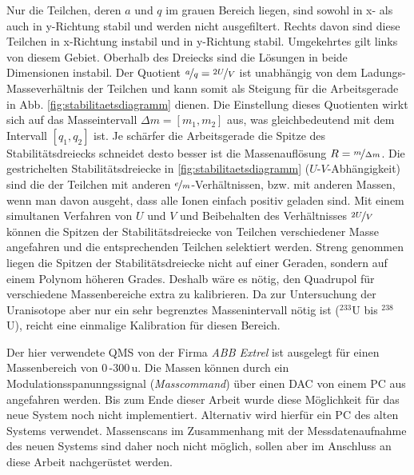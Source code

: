 Nur die Teilchen, deren $a$ und $q$ im grauen
Bereich liegen, sind sowohl in x- als auch in y-Richtung stabil und werden nicht
ausgefiltert. Rechts davon sind diese Teilchen in x-Richtung instabil und in
y-Richtung stabil. Umgekehrtes gilt links von diesem Gebiet. Oberhalb des
Dreiecks sind die Lösungen in beide Dimensionen instabil. Der Quotient
$\nicefrac{a}{q}=\nicefrac{2U}{V}$ ist unabhängig von dem Ladungs-Masseverhältnis der Teilchen und kann somit als Steigung für die Arbeitsgerade in Abb.
\ref{fig:stabilitaetsdiagramm} dienen. Die Einstellung dieses Quotienten wirkt
sich auf das Masseintervall $\Delta m=[m_1,m_2]$ aus, was
gleichbedeutend mit dem Intervall $[q_1,q_2]$ ist. Je schärfer die Arbeitsgerade die Spitze des
Stabilitätsdreiecks schneidet desto besser ist die Massenauflösung
$R=\nicefrac{m}{\Delta m}$. Die gestrichelten Stabilitätsdreiecke in
\ref{fig:stabilitaetsdiagramm}
($U$-$V$-Abhängigkeit) sind die der Teilchen mit anderen $\nicefrac{e}{m}$-Verhältnissen, bzw. mit anderen Massen, wenn man davon
ausgeht, dass alle Ionen einfach positiv geladen sind.
Mit einem simultanen Verfahren von $U$ und $V$ und Beibehalten des Verhältnisses
$\nicefrac{2U}{V}$ können die Spitzen der Stabilitätsdreiecke von Teilchen verschiedener Masse angefahren und die entsprechenden Teilchen
selektiert werden. Streng genommen liegen die Spitzen der
Stabilitätsdreiecke nicht auf einer Geraden, sondern auf einem Polynom höheren
Grades. Deshalb wäre es nötig, den Quadrupol für verschiedene Massenbereiche
extra zu kalibrieren. Da zur Untersuchung der Uranisotope aber nur ein sehr
begrenztes Massenintervall nötig ist ($^{233}$U bis $^{238}$U), reicht eine
einmalige Kalibration für diesen Bereich.\par
Der hier verwendete QMS von der Firma \textit{ABB
Extrel} ist ausgelegt für einen Massenbereich von $0\,$-$300\,$u. Die Massen
können durch ein Modulationsspanunngssignal (\textit{Masscommand}) über einen
DAC von einem PC aus angefahren werden. Bis zum Ende dieser Arbeit wurde diese
Möglichkeit für das neue System noch nicht implementiert. Alternativ wird
hierfür ein PC des alten Systems verwendet. Massenscans im Zusammenhang mit der
Messdatenaufnahme des neuen Systems sind daher noch nicht möglich, sollen aber
im Anschluss an diese Arbeit nachgerüstet werden.

